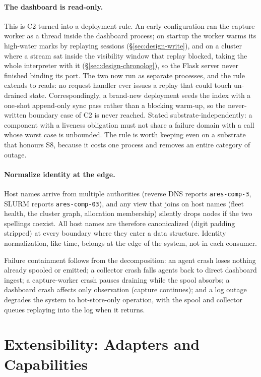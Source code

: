 \paragraph{The dashboard is read-only.} This is C2 turned into a
deployment rule. An early configuration ran the capture worker as a thread
inside the dashboard process; on startup the worker warms its high-water
marks by replaying sessions (\S\ref{sec:design-write}), and on a cluster
where a stream sat inside the visibility window that replay blocked, taking
the whole interpreter with it (\S\ref{sec:design-chronolog}), so the Flask
server never finished binding its port. The two now
run as separate processes, and the rule extends to reads: no request
handler ever issues a replay that could touch un-drained state. Correspondingly,
a brand-new deployment seeds the index with a one-shot append-only sync
pass rather than a blocking warm-up, so the never-written boundary case of
C2 is never reached. Stated substrate-independently: a component with a
liveness obligation must not share a failure domain with a call whose
worst case is unbounded. The rule is worth keeping even on a substrate that
honours S8, because it costs one process and removes an entire category of
outage.

\paragraph{Normalize identity at the edge.} Host names arrive from multiple
authorities (reverse DNS reports \texttt{ares-comp-3}, SLURM reports
\texttt{ares-comp-03}), and any view that joins on host names (fleet
health, the cluster graph, allocation membership) silently drops nodes if
the two spellings coexist. All host names are therefore canonicalized (digit
padding stripped) at every boundary where they enter a data structure.
Identity normalization, like time, belongs at the edge of the system, not
in each consumer.

Failure containment follows from the decomposition: an agent crash loses
nothing already spooled or emitted; a collector crash falls agents back to
direct dashboard ingest; a capture-worker crash pauses draining while the
spool absorbs; a dashboard crash affects only observation (capture
continues); and a log outage degrades the system to hot-store-only
operation, with the spool and collector queues replaying into the log when
it returns.

\section{Extensibility: Adapters and Capabilities}
\label{sec:design-adapters}

